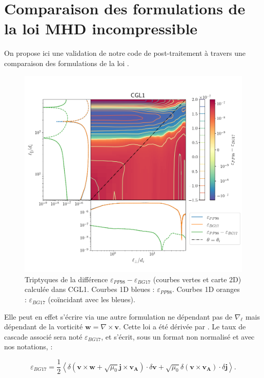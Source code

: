 
 \section{Comparaison des formulations de la loi MHD incompressible} \label{an:compa_BG17}
 
  On propose ici une validation de notre code de post-traitement à travers une comparaison des formulations de la loi .
  
 \begin{figure}[!ht]
  \centering
 \includegraphics[width=0.75\linewidth,trim=0cm 1cm 0cm 2cm, clip=true]{./Mainmatter/Part_3/images_ch2/CGL1_BG17}
 \cprotect\caption{Triptyques de la différence \ensuremath{\varepsilon_{PP98}-\varepsilon_{BG17}} (courbes vertes et carte 2D) calculée dans CGL1. Courbes 1D bleues : \ensuremath{\varepsilon_{PP98}}. Courbes 1D oranges : \ensuremath{\varepsilon_{BG17}} (coïncidant avec les bleues).}
 \label{fig:BG17}
  \end{figure}
  
 Elle peut en effet s'écrire via une autre formulation ne dépendant pas de $\nabla_{\boldsymbol{\ell}}$ mais dépendant de la vorticité $\boldsymbol{w} = \nabla \times \boldsymbol{v}$. Cette loi a été dérivée par \cite{banerjee_exact_2017}. Le taux de cascade associé sera noté $\varepsilon_{BG17}$, et s'écrit, sous un format non normalisé et avec nos notations, : 



\begin{equation}
     \varepsilon_{BG17} = \frac{1}{2} \left< \delta\left(\boldsymbol{v} \times \boldsymbol{w} + \sqrt{\mu_0} \boldsymbol{j} \times\boldsymbol{v_A}\right) \cdot \delta \boldsymbol{v} + \sqrt{\mu_0} \delta\left(\boldsymbol{v}\times \boldsymbol{v_A}\right)\cdot \delta \boldsymbol{j}\right> .
 \end{equation}
 
